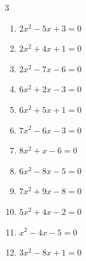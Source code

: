 \begin{multicols}{3}
\begin{enumerate}

  \item $2x^{2}-5x+3=0$


  \item $2x^{2}+4x+1=0$


  \item $2x^{2}-7x-6=0$


\columnbreak %

\resetques

  \item $6x^{2}+2x-3=0$


  \item $6x^{2}+5x+1=0$


  \item $7x^{2}-6x-3=0$


  \item $8x^{2}+x-6=0$


  \item $6x^{2}-8x-5=0$


  \item $7x^{2}+9x-8=0$


  \item $5x^{2}+4x-2=0$


\columnbreak %

  \item $x^{2}-4x-5=0$

        \phantom{$\displaystyle x=5, \; -1$}

  \item $3x^{2}-8x+1=0$


\end{enumerate}
\end{multicols}
